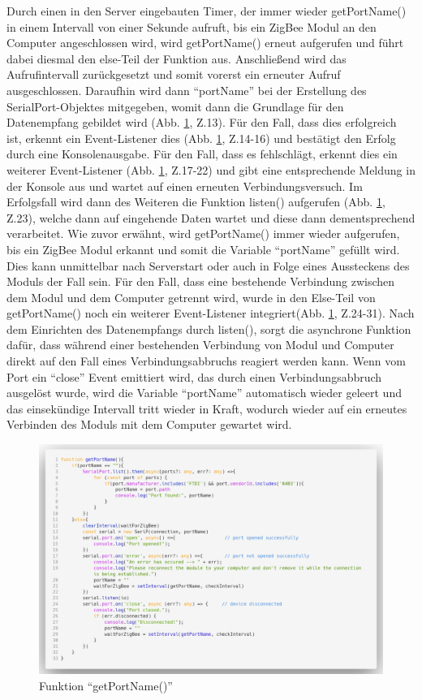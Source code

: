 \documentclass[]{article}
\begin{document}
Durch einen in den Server eingebauten Timer, der immer wieder getPortName() in einem Intervall von einer Sekunde aufruft, bis ein ZigBee Modul an den Computer angeschlossen wird, wird getPortName() erneut aufgerufen und führt dabei diesmal den else-Teil der Funktion aus. Anschließend wird das Aufrufintervall zurückgesetzt und somit vorerst ein erneuter Aufruf ausgeschlossen. Daraufhin wird dann “portName” bei der Erstellung des SerialPort-Objektes mitgegeben, womit dann die Grundlage für den Datenempfang gebildet wird (Abb. \ref{img:getPortName}, Z.13). Für den Fall, dass dies erfolgreich ist, erkennt ein Event-Listener dies (Abb. \ref{img:getPortName}, Z.14-16) und bestätigt den Erfolg durch eine Konsolenausgabe. Für den Fall, dass es fehlschlägt, erkennt dies ein weiterer Event-Listener (Abb. \ref{img:getPortName}, Z.17-22) und gibt eine entsprechende Meldung in der Konsole aus und wartet auf einen erneuten Verbindungsversuch. Im Erfolgsfall wird dann des Weiteren die Funktion listen() aufgerufen (Abb. \ref{img:getPortName}, Z.23), welche dann auf eingehende Daten wartet und diese dann dementsprechend verarbeitet.\newline
Wie zuvor erwähnt, wird getPortName() immer wieder aufgerufen, bis ein ZigBee Modul erkannt und somit die Variable “portName” gefüllt wird. Dies kann unmittelbar nach Serverstart oder auch in Folge eines Aussteckens des Moduls der Fall sein. Für den Fall, dass eine bestehende Verbindung zwischen dem Modul und dem Computer getrennt wird, wurde in den Else-Teil von getPortName() noch ein weiterer Event-Listener integriert(Abb. \ref{img:getPortName}, Z.24-31). Nach dem Einrichten des Datenempfangs durch listen(), sorgt die asynchrone Funktion dafür, dass während einer bestehenden Verbindung von Modul und Computer direkt auf den Fall eines Verbindungsabbruchs reagiert werden kann. Wenn vom Port ein “close” Event emittiert wird, das durch einen Verbindungsabbruch ausgelöst wurde, wird die Variable “portName” automatisch wieder geleert und das einsekündige Intervall tritt wieder in Kraft, wodurch wieder auf ein erneutes Verbinden des Moduls mit dem Computer gewartet wird.  
						\begin{figure}[!h]
							\centering
							\includegraphics[scale=0.18]{images/getPortName}
							\caption{Funktion “getPortName()”}
							\label{img:getPortName}
						\end{figure}
\end{document}
